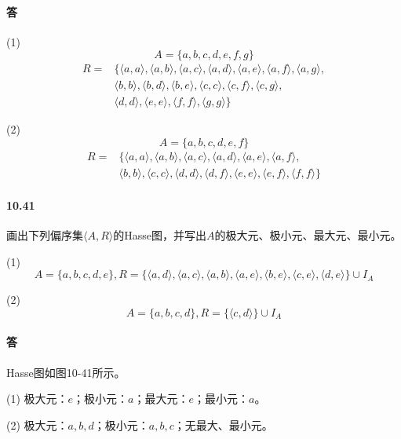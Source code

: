 \documentclass[UTF8]{ctexart}
\begin{document}
\paragraph{答}
    (1) 
    $$A = \{ a,b,c,d,e,f,g \} $$
    \begin{align*}
        R = & \{ \langle a,a \rangle , \langle a,b \rangle , \langle a,c \rangle , \langle a,d \rangle , \langle a,e \rangle , \langle a,f \rangle , \langle a,g \rangle , \\
        & \langle b,b \rangle , \langle b,d \rangle , \langle b,e \rangle , \langle c,c \rangle , \langle c,f \rangle , \langle c,g \rangle , \\
        & \langle d,d \rangle , \langle e,e \rangle , \langle f,f \rangle , \langle g,g \rangle \} 
    \end{align*}

    (2)
    $$A = \{ a,b,c,d,e,f \} $$
    \begin{align*}
        R = & \{ \langle a,a \rangle , \langle a,b \rangle , \langle a,c \rangle , \langle a,d \rangle , \langle a,e \rangle , \langle a,f \rangle , \\
        & \langle b,b \rangle , \langle c,c \rangle , \langle d,d \rangle , \langle d,f \rangle , \langle e,e \rangle , \langle e,f \rangle , \langle f,f \rangle \}
    \end{align*}

\paragraph{10.41} \label{10.41}
    画出下列偏序集$ \langle A,R \rangle $的Hasse图，并写出$A$的极大元、极小元、最大元、最小元。

    (1) $$A = \{ a,b,c,d,e \} , R= \{ \langle a,d \rangle , \langle a,c \rangle , \langle a,b \rangle , \langle a,e \rangle , \langle b,e \rangle , \langle c,e \rangle , \langle d,e \rangle \} \cup I_A $$

    (2) $$A = \{ a,b,c,d \} , R = \{ \langle c,d \rangle \} \cup I_A$$

\paragraph{答}
    Hasse图如图10-41所示。
    
    (1) 极大元：$e$；极小元：$a$；最大元：$e$；最小元：$a$。

    (2) 极大元：$a,b,d$；极小元：$a,b,c$；无最大、最小元。
\end{document}
